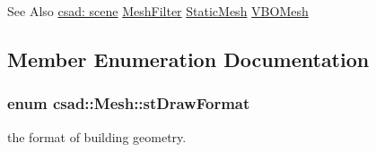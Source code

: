 \begin{DoxySeeAlso}{See Also}
\hyperlink{group__scene}{csad\-: scene} \hyperlink{classcsad_1_1_mesh_filter}{Mesh\-Filter} \hyperlink{classcsad_1_1_static_mesh}{Static\-Mesh} \hyperlink{classcsad_1_1_v_b_o_mesh}{V\-B\-O\-Mesh} 
\end{DoxySeeAlso}


\subsection{Member Enumeration Documentation}
\hypertarget{classcsad_1_1_mesh_a0992cfc5c22b440ba3db818112d69caf}{
\subsubsection[{st\-Draw\-Format}]{\setlength{\rightskip}{0pt plus 5cm}enum {\bf csad\-::\-Mesh\-::st\-Draw\-Format}}}\label{classcsad_1_1_mesh_a0992cfc5c22b440ba3db818112d69caf}


the format of building geometry. 


